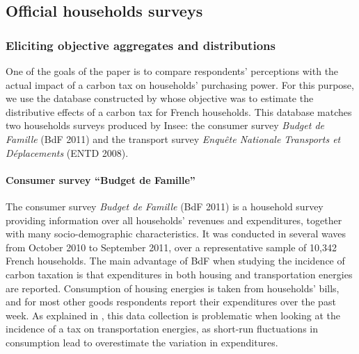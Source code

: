 \documentclass[11pt]{article}
\begin{document}
\subsection{Official households surveys\label{subsec:Households-surveys}}

    \subsubsection{Eliciting objective aggregates and distributions \label{subsubsec:comparing-obj-subj}}
One of the goals of the paper is to compare respondents' perceptions with the actual impact of a carbon tax on households' purchasing power. For this purpose, we use the database constructed by \citet{douenne_vertical_2018} whose objective was to estimate the distributive effects of a carbon tax for French households. This database matches two households surveys produced by Insee: the consumer survey \emph{Budget de Famille} (BdF 2011) and the transport survey \emph{Enquête Nationale Transports et Déplacements} (ENTD 2008).

\paragraph{Consumer survey ``Budget de Famille''}

The consumer survey \emph{Budget de Famille} (BdF 2011) is a household survey providing information over all households' revenues and expenditures, together with many socio-demographic characteristics. It was conducted in several waves from October 2010 to September 2011, over a representative sample of 10,342 French households. The main advantage of BdF when studying the incidence of carbon taxation is that expenditures in both housing and transportation energies are reported. Consumption of housing energies is taken from households' bills, and for most other goods respondents report their expenditures over the past week. As explained in \citet{douenne_vertical_2018}, this data collection is problematic when looking at the incidence of a tax on transportation energies, as short-run fluctuations in consumption lead to overestimate the variation in expenditures.
\end{document}
